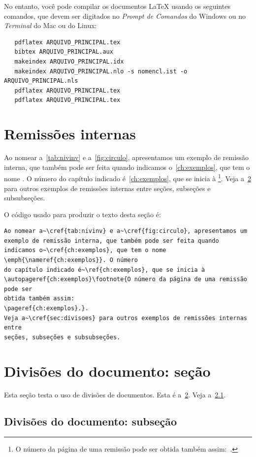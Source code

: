 No entanto, você pode compilar os documentos \LaTeX{} usando os seguintes
comandos, que devem ser digitados no \emph{Prompt de Comandos} do Windows ou no
\emph{Terminal} do Mac ou do Linux:

\begin{verbatim}
   pdflatex ARQUIVO_PRINCIPAL.tex
   bibtex ARQUIVO_PRINCIPAL.aux
   makeindex ARQUIVO_PRINCIPAL.idx
   makeindex ARQUIVO_PRINCIPAL.nlo -s nomencl.ist -o ARQUIVO_PRINCIPAL.nls
   pdflatex ARQUIVO_PRINCIPAL.tex
   pdflatex ARQUIVO_PRINCIPAL.tex
\end{verbatim}

\section{Remissões internas}

Ao nomear a~\cref{tab:nivinv} e a~\cref{fig:circulo}, apresentamos um
exemplo de remissão interna, que também pode ser feita quando indicamos o~\cref{ch:exemplos}, que tem o nome \emph{}. O número
do capítulo indicado é~\ref{ch:exemplos}, que se inicia à
\footnote{O número da página de uma remissão pode ser
	obtida também assim:~\pageref{ch:exemplos}.}.
Veja a~\cref{sec:divisoes} para outros exemplos de remissões internas entre
seções, subseções e subsubseções.

O código usado para produzir o texto desta seção é:

\begin{verbatim}
Ao nomear a~\cref{tab:nivinv} e a~\cref{fig:circulo}, apresentamos um
exemplo de remissão interna, que também pode ser feita quando indicamos o~\cref{ch:exemplos}, que tem o nome \emph{\nameref{ch:exemplos}}. O número
do capítulo indicado é~\ref{ch:exemplos}, que se inicia à
\autopageref{ch:exemplos}\footnote{O número da página de uma remissão pode ser
obtida também assim:
\pageref{ch:exemplos}.}.
Veja a~\cref{sec:divisoes} para outros exemplos de remissões internas entre
seções, subseções e subsubseções.
\end{verbatim}

\section{Divisões do documento: seção}%
\label{sec:divisoes}

Esta seção testa o uso de divisões de documentos. Esta é a~\cref{sec:divisoes}. Veja a~\cref{subsec:divisoes}.

\subsection{Divisões do documento: subseção}%
\label{subsec:divisoes}

